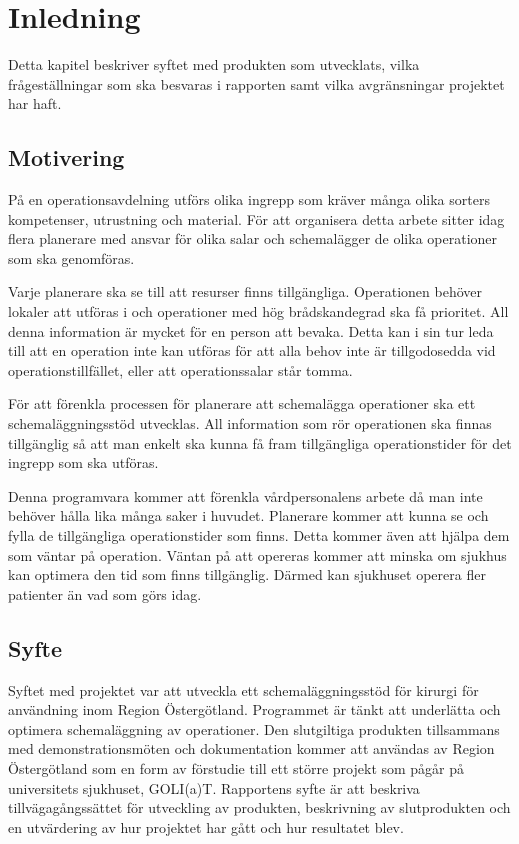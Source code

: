 \chapter{Inledning}
Detta kapitel beskriver syftet med produkten som utvecklats, vilka frågeställningar som ska besvaras i rapporten samt vilka avgränsningar projektet har haft.

\section{Motivering}
På en operationsavdelning utförs olika ingrepp som kräver många olika sorters kompetenser, utrustning och material. 
För att organisera detta arbete sitter
idag flera planerare med ansvar för olika salar och schemalägger de olika operationer som ska genomföras. 

Varje planerare ska se till att resurser finns tillgängliga. Operationen behöver lokaler att utföras i och operationer med hög brådskandegrad ska få prioritet. All denna information är
mycket för en person att bevaka. Detta kan i sin tur leda till att en operation inte kan utföras för att alla behov inte är tillgodosedda vid operationstillfället,
eller att operationssalar står tomma.

För att förenkla processen för planerare att schemalägga operationer ska ett schemaläggningsstöd utvecklas. All information som rör operationen ska finnas
tillgänglig så att man enkelt ska kunna få fram tillgängliga operationstider för det ingrepp som ska utföras. 

Denna programvara kommer att förenkla  vårdpersonalens arbete då man inte behöver hålla lika många saker i huvudet. Planerare kommer att kunna se och fylla de tillgängliga operationstider som finns.
Detta kommer även att hjälpa dem som väntar på operation. Väntan på att opereras kommer att minska om sjukhus kan optimera den tid som finns tillgänglig. Därmed kan sjukhuset operera fler patienter än vad som görs idag.

\section{Syfte}\label{sec:syfte}
Syftet med projektet var att utveckla ett schemaläggningsstöd för kirurgi för användning inom Region Östergötland. Programmet är tänkt att underlätta och optimera schemaläggning av operationer. Den slutgiltiga produkten tillsammans med demonstrationsmöten och dokumentation kommer att användas av Region Östergötland som en form av förstudie till ett större projekt som pågår på universitets sjukhuset, GOLI(a)T. \cite{goliat} Rapportens syfte är att beskriva tillvägagångssättet för utveckling av produkten, beskrivning av slutprodukten och en utvärdering av hur projektet har gått och hur resultatet blev.

